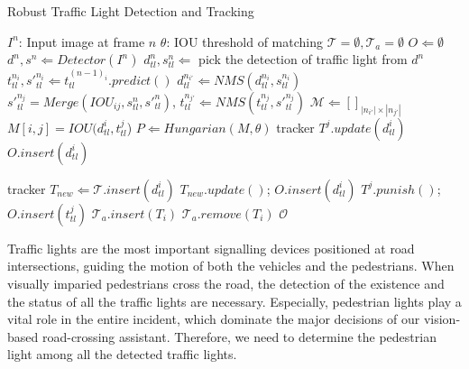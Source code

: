 \begin{algorithm}[H]
\caption{Robust Traffic Light Detection and Tracking} 
\label{alg:traffic_light}
\begin{algorithmic}[1]
\State $I^n$: Input image at frame $n$
\State $\theta$: IOU threshold of matching
\State $\mathcal{T} = \emptyset, \mathcal{T}_a = \emptyset$ 
\State $O \Leftarrow \emptyset$
\State $d^{n}, s^{n} \Leftarrow Detector(I^n)$
\State $d_{tl}^{n}, s_{tl}^{n} \Leftarrow$ pick the detection of traffic light from $d^{n}$
{} 
\State $t_{tl}^{n_i}, {s'}_{tl}^{n_i} \Leftarrow  t_{tl}^{(n-1)_i}.predict()$
\EndFor 
\State $d_{tl}^{n_{i'}} \Leftarrow NMS(d_{tl}^{n_i}, s_{tl}^{n_i})$
\State ${s'}_{tl}^{n_{j}} = Merge(IOU_{ij}, s_{tl}^n, {s'}_{tl}^n)$, $t_{tl}^{n_{j'}} \Leftarrow NMS(t_{tl}^{n_j}, {s'}_{tl}^{n_j})$
\State $\mathcal{M} \Leftarrow []_{|n_{i'}| \times |n_{j'}|}$
\State $M[i, j] = IOU(d_{tl}^i, t_{tl}^j$)
\EndFor
\EndFor
\State $ P \Leftarrow Hungarian(M, \theta)$
\State tracker $T^j.update(d_{tl}^i)$
\State $O.insert(d_{tl}^i)$
\EndFor

\State tracker $ T_{new} \Leftarrow \mathcal{T}.insert(d_{tl}^i)$
\State $T_{new}.update()$; $O.insert(d_{tl}^i)$
\EndFor
{}
\State $T^j.punish()$; $O.insert(t_{tl}^j)$
\EndFor
{}
\State $\mathcal{T}_a.insert(T_i)$ 
\EndIf
{}
\State $\mathcal{T}_a.remove(T_i)$
\EndIf
\EndFor
\Return $\mathcal{O}$
\EndProcedure
\end{algorithmic}
\end{algorithm}




Traffic lights are the most important signalling devices positioned at road intersections, guiding the motion of both the vehicles and the pedestrians. When visually imparied pedestrians cross the road, the detection of the existence and the status of all the traffic lights are necessary. Especially, pedestrian lights play a vital role in the entire incident, which dominate the major decisions of our vision-based road-crossing assistant. Therefore, we need to determine the pedestrian light among all the detected traffic lights.


